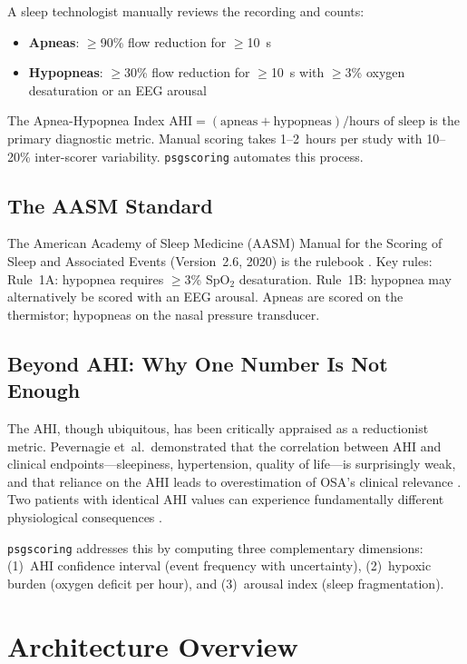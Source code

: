 \documentclass[11pt,a4paper]{article}
\begin{document}
A sleep technologist manually reviews the recording and counts:
\begin{itemize}[nosep]
  \item \textbf{Apneas}: $\geq$90\% flow reduction for $\geq$10~s
  \item \textbf{Hypopneas}: $\geq$30\% flow reduction for $\geq$10~s
    with $\geq$3\% oxygen desaturation or an EEG arousal
\end{itemize}
The Apnea-Hypopnea Index
$\text{AHI} = (\text{apneas} + \text{hypopneas})/\text{hours of sleep}$
is the primary diagnostic metric.
Manual scoring takes 1--2~hours per study with 10--20\% inter-scorer
variability. \texttt{psgscoring} automates this process.

\subsection{The AASM Standard}

The American Academy of Sleep Medicine (AASM) Manual for the Scoring of
Sleep and Associated Events (Version~2.6, 2020) is the rulebook
\cite{berry2020}. Key rules:
Rule~1A: hypopnea requires $\geq$3\% SpO$_2$ desaturation.
Rule~1B: hypopnea may alternatively be scored with an EEG arousal.
Apneas are scored on the thermistor; hypopneas on the nasal pressure
transducer.

\subsection{Beyond AHI: Why One Number Is Not Enough}

The AHI, though ubiquitous, has been critically appraised as a
reductionist metric. Pevernagie et~al.\ demonstrated that the
correlation between AHI and clinical endpoints---sleepiness,
hypertension, quality of life---is surprisingly weak, and that reliance
on the AHI leads to overestimation of OSA's clinical relevance
\cite{pevernagie2020}. Two patients with identical AHI values can
experience fundamentally different physiological consequences
\cite{pevernagie2025}.

\texttt{psgscoring} addresses this by computing three complementary
dimensions: (1)~AHI confidence interval (event frequency with
uncertainty), (2)~hypoxic burden (oxygen deficit per hour), and
(3)~arousal index (sleep fragmentation).

\section{Architecture Overview}
\end{document}
